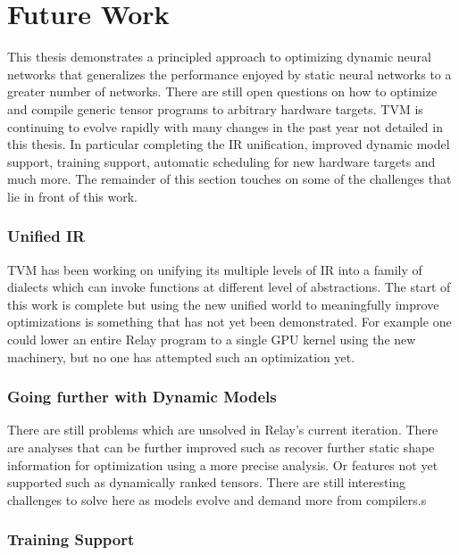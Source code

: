 \chapter{Future Work}
\label{ch:future}

This thesis demonstrates a principled approach to optimizing dynamic neural networks
    that generalizes the performance enjoyed by static neural networks to a greater
    number of networks.
There are still open questions on how to optimize and compile
    generic tensor programs to arbitrary hardware targets.
TVM is continuing to evolve rapidly
    with many changes in the past year not detailed
    in this thesis.
In particular completing the IR unification, improved
    dynamic model support, training support, automatic
    scheduling for new hardware targets and much more.
The remainder of this section touches on some of the
    challenges that lie in front of this work.

\subsection{Unified IR}

TVM has been working on unifying its multiple levels of
    IR into a family of dialects which can invoke functions
    at different level of abstractions.
The start of this work is complete but using the
    new unified world to meaningfully improve optimizations
    is something that has not yet been demonstrated.
For example one could lower an entire Relay program
    to a single GPU kernel using the new machinery,
    but no one has attempted such an optimization yet.

\subsection{Going further with Dynamic Models}

There are still problems which are unsolved in Relay's
    current iteration.
There are analyses that can be further improved such as
    recover further static shape information for optimization
    using a more precise analysis.
Or features not yet supported such as dynamically ranked tensors.
There are still interesting challenges to solve here as
    models evolve and demand more from compilers.s

\subsection{Training Support}

